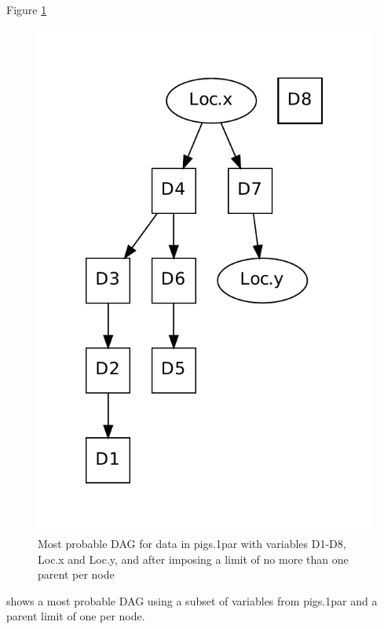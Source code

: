 \documentclass[nojss]{jss}
\begin{document}
Figure \ref{fig7}
\begin{figure}[htb]\hspace{4.0cm}
\includegraphics[angle=0,scale=0.5]{map1_10var}
\caption{Most probable DAG for data in pigs.1par with variables D1-D8, Loc.x and Loc.y, and after imposing a limit of no more than one parent per node} \label{fig7}
\end{figure}
shows a most probable DAG using a subset of variables from pigs.1par and a parent limit of one per node. 
\end{document}
